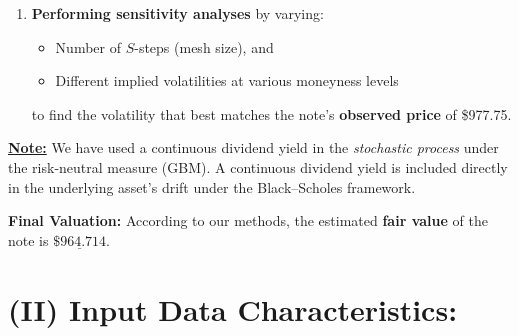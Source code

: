 \documentclass[12pt,a4paper]{article}
\begin{document}
\begin{enumerate}
\item \textbf{Performing sensitivity analyses} by varying:
   \begin{itemize}
   \item Number of \(S\)-steps (mesh size), and
   \item Different implied volatilities at various moneyness levels 
   \end{itemize}
   to find the volatility that best matches the note's \textbf{observed price} of \$977.75.
\end{enumerate}

\noindent
\underline{\textbf{Note:}} 
We have used a continuous dividend yield in the \textit{stochastic process} under the risk-neutral measure (GBM). A continuous dividend yield is included directly in the underlying asset’s drift under the Black–Scholes framework.

\vspace{0.5cm}

\noindent
\textbf{Final Valuation: } According to our methods, the estimated \textbf{fair value} of the note is \(\underline{\$964.714}.\)

\section*{(II) Input Data Characteristics:}
\end{document}
